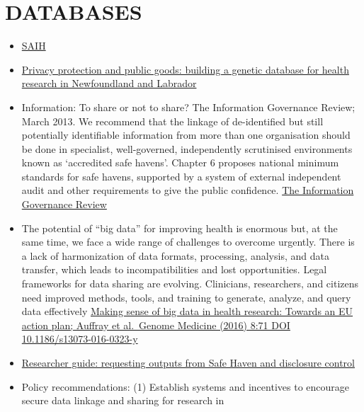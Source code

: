\documentclass[]{book}
\begin{document}
\hypertarget{databases}{%
\section*{DATABASES}\label{databases}}

\begin{itemize}
\item
  \href{http://www.saude.sp.gov.br/resources/ses/perfil/gestor/homepage/auditoria/manuais/manual_sih_janeiro_2017.pdf}{SAIH}
\item
  \href{https://www.ncbi.nlm.nih.gov/pmc/articles/PMC3555321/}{Privacy protection and public goods: building a genetic database for health research in Newfoundland and Labrador}
\item
  Information: To share or not to share? The Information Governance Review; March 2013. We recommend that the linkage of de-identified but still potentially identifiable information from more than one organisation should be done in specialist, well-governed, independently scrutinised environments known as `accredited safe havens'. Chapter 6 proposes national minimum standards for safe havens, supported by a system of external independent audit and other requirements to give the public confidence. \href{https://assets.publishing.service.gov.uk/government/uploads/system/uploads/attachment_data/file/192572/2900774_InfoGovernance_accv2.pdf}{The Information Governance Review}
\item
  The potential of ``big data'' for improving health is enormous but, at the same time, we face a wide range of challenges to overcome urgently. There is a lack of harmonization of data formats, processing, analysis, and data transfer, which leads to incompatibilities and lost opportunities. Legal frameworks for data sharing are evolving. Clinicians, researchers, and citizens need improved methods, tools, and training to generate, analyze, and query data effectively \href{https://genomemedicine.biomedcentral.com/track/pdf/10.1186/s13073-016-0323-y}{Making sense of big data in health research: Towards an EU action plan; Auffray et al.~Genome Medicine (2016) 8:71 DOI 10.1186/s13073-016-0323-y}
\item
  \href{https://www.isdscotland.org/Products-and-Services/EDRIS/_docs/Researcher-guide-to-disclosure-control-V1-2.pdf}{Researcher guide: requesting outputs from Safe Haven and disclosure control}
\item
  Policy recommendations: (1) Establish systems and incentives to encourage secure data linkage and sharing for research in

\end{itemize}
\end{document}
